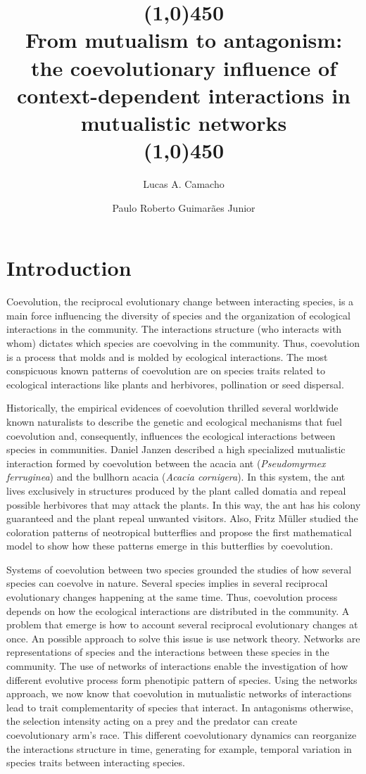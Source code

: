 \documentclass[a4paper, 12pt]{article}
\title{\vspace{-1.0cm} \line(1,0){450} \\From mutualism to antagonism: the coevolutionary influence of  context-dependent interactions in mutualistic networks\\\line(1,0){450}}
\author[1]{Lucas A. Camacho}
\author[2]{Paulo Roberto Guimarães Junior}
\date{}
\affil[1,2]{Departamento de Ecologia, Universidade de São Paulo, Rua do Matão, travessa 14, nº 321, Cidade Universitária, São Paulo - SP, CEP: 05508-090, Brasil.}
\begin{document}
\begingroup
\linespread{1.0}
\maketitle
\endgroup

\section{Introduction}
\linenumbers
Coevolution, the reciprocal evolutionary change between interacting species, is a main force influencing the diversity of species and the organization of ecological interactions in the community. The interactions structure (who interacts with whom) dictates which species are coevolving in the community. Thus, coevolution is a process that molds and is molded by ecological interactions. The most conspicuous known patterns of coevolution are on species traits related to ecological interactions like plants and herbivores, pollination or seed dispersal.

Historically, the empirical evidences of coevolution thrilled several worldwide known naturalists to describe the genetic and ecological mechanisms that fuel coevolution and, consequently, influences the ecological interactions between species in communities. Daniel Janzen described a high specialized mutualistic interaction formed by coevolution between the acacia ant (\textit{Pseudomyrmex ferruginea}) and the bullhorn acacia (\textit{Acacia cornigera}). In this system, the ant lives exclusively in structures produced by the plant called domatia and repeal possible herbivores that may attack the plants. In this way, the ant has his colony guaranteed and the plant repeal unwanted visitors. Also, Fritz Müller studied the coloration patterns of neotropical butterflies and propose the first mathematical model to show how these patterns emerge in this butterflies by coevolution.

Systems of coevolution between two species  grounded the studies of how several species can coevolve in nature. Several species implies in several reciprocal evolutionary changes happening at the same time. Thus, coevolution process depends on how the ecological interactions are distributed in the community. A problem that emerge is how to account several reciprocal evolutionary changes at once. An possible approach to solve this issue is use network theory. Networks are representations of species and the interactions between these species in the community. The use of networks of interactions enable the investigation of how different evolutive process form phenotipic pattern of species. Using the networks approach, we now know that coevolution in mutualistic networks of interactions lead to trait complementarity of species that interact. In antagonisms otherwise, the selection intensity acting on a prey and the predator can create coevolutionary arm's race. This different coevolutionary dynamics can reorganize the interactions structure in time, generating for example, temporal variation in species traits between interacting species.
\end{document}
